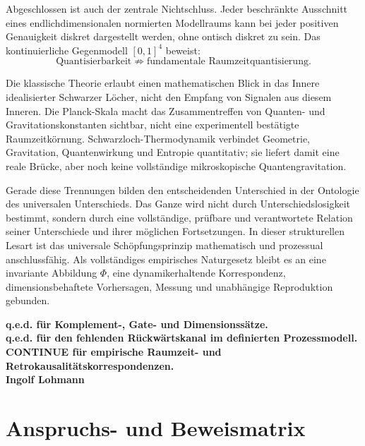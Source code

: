 \documentclass[11pt,a4paper]{article}
\theoremstyle{remark}
\newcommand{\statusbox}[2]{%
  \par\medskip\noindent
  \colorbox{#1}{\parbox{\dimexpr\linewidth-2\fboxsep\relax}{#2}}%
  \par\medskip
}
\begin{document}
Abgeschlossen ist auch der zentrale Nichtschluss. Jeder beschränkte
Ausschnitt eines endlichdimensionalen normierten Modellraums kann bei jeder
positiven Genauigkeit diskret dargestellt werden, ohne ontisch diskret zu
sein. Das kontinuierliche Gegenmodell \([0,1]^4\) beweist:
\[
  \text{Quantisierbarkeit}
  \not\Rightarrow
  \text{fundamentale Raumzeitquantisierung}.
\]

Die klassische Theorie erlaubt einen mathematischen Blick in das Innere
idealisierter Schwarzer Löcher, nicht den Empfang von Signalen aus diesem
Inneren. Die Planck-Skala macht das Zusammentreffen von Quanten- und
Gravitationskonstanten sichtbar, nicht eine experimentell bestätigte
Raumzeitkörnung. Schwarzloch-Thermodynamik verbindet Geometrie, Gravitation,
Quantenwirkung und Entropie quantitativ; sie liefert damit eine reale Brücke,
aber noch keine vollständige mikroskopische Quantengravitation.

Gerade diese Trennungen bilden den entscheidenden Unterschied in der
Ontologie des universalen Unterschieds. Das Ganze wird nicht durch
Unterschiedslosigkeit bestimmt, sondern durch eine vollständige, prüfbare und
verantwortete Relation seiner Unterschiede und ihrer möglichen Fortsetzungen.
In dieser strukturellen Lesart ist das universale Schöpfungsprinzip
mathematisch und prozessual anschlussfähig. Als vollständiges empirisches
Naturgesetz bleibt es an eine invariante Abbildung \(\Phi\), eine
dynamikerhaltende Korrespondenz, dimensionsbehaftete Vorhersagen, Messung und
unabhängige Reproduktion gebunden.

\statusbox{QGreen}{
\begin{center}
\textbf{q.e.d. für Komplement-, Gate- und Dimensionssätze.}\\[0.4em]
\textbf{q.e.d. für den fehlenden Rückwärtskanal im definierten Prozessmodell.}\\[0.4em]
\textbf{CONTINUE für empirische Raumzeit- und Retrokausalitätskorrespondenzen.}\\[0.4em]
\textbf{Ingolf Lohmann}
\end{center}
}

\appendix

\section{Anspruchs- und Beweismatrix}
\end{document}
